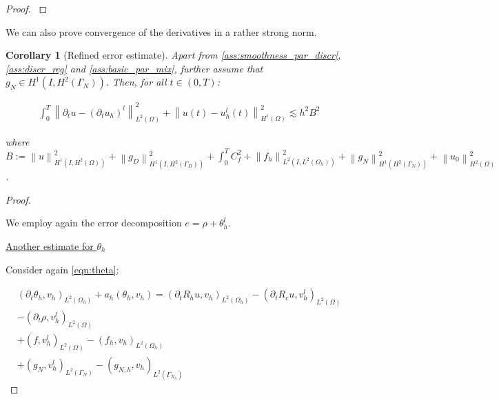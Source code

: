 \documentclass[english,a4paper,9pt,oneside]{scrbook}	%
\theoremstyle{break}
\newtheorem{cor}[equation]{Corollary}
\newenvironment{mproof}[1][\proofname]{%
  \begin{proof}[#1]$ $\par\nobreak\ignorespaces
}{%
  \end{proof}
}
\renewcommand*{\proofname}{Proof}
\theoremstyle{remark}
\newcommand{\ds}{\displaystyle}
\newcommand{\norm}[1]{\left\lVert#1\right\rVert}
\begin{document}
\begin{appendices}
\begin{mproof}
\end{mproof}

We can also prove convergence of the derivatives in a rather strong norm.

\begin{cor}[Refined error estimate]
\label{cor:L2_deriv_est}
Apart from \cref{ass:smoothness_par_discr}, \cref{ass:discr_reg} and \cref{ass:basic_par_mix}, further assume that $g_{N}\in H^1(I, H^2(\Gamma_N))$. Then, for all $t \in (0,T)$:

\begin{align*}
	\int_0^T\norm{\partial_tu - (\partial_t u_h)^l}^2_{L^2(\Omega)} + \norm{u(t)-u_h^l(t)}_{H^1(\Omega)}^2 \lesssim h^2 B^2
\end{align*}


where $B:=\ds \norm{u}_{H^1(I,H^2(\Omega))}^2 + \norm{g_D}_{H^1(I,H^2(\Gamma_D))}^2 +  \int_0^T C_f^2+  \norm{f_h}_{L^2(I,L^2(\Omega_h))}^2 +\norm{g_N}_{H^1(H^2(\Gamma_N))}^2+\norm{u_0}_{H^2(\Omega)}^2$.

\end{cor}

\begin{mproof}

We employ again the error decomposition $e = \rho + \theta_h^l$.

%
%
%

\underline{Another estimate for $\theta_h$}

Consider again \cref{eqn:theta}:

\begin{align*}
(\partial_t \theta_h , v_h)_{L^2(\Omega_h)} + a_h(\theta_h, v_h) = 
(\partial_t R_h u , v_h)_{L^2(\Omega_h)} - (\partial_t R_c u , v_h^l)_{L^2(\Omega)}\\
- (\partial_t \rho, v_h^l)_{L^2(\Omega)}\\ + (f, v_h^l)_{L^2(\Omega)} - (f_h, v_h)_{L^2(\Omega_h)}\\ + (g_{N}, v_h^l)_{L^2(\Gamma_{N})} - (g_{N,h}, v_h)_{L^2(\Gamma_{N_h})} 
\end{align*}


\end{mproof}
\end{appendices}
\end{document}
